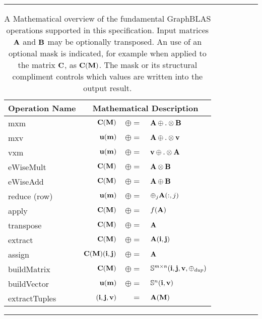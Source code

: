 \begin{table*}[h]
\hrule
\begin{center}
\caption{A Mathematical overview of the fundamental GraphBLAS operations supported
in this specification.  Input matrices ${\bf A}$ and ${\bf B}$ may be optionally
transposed.   An use of an optional mask is indicated, for example when applied to the matrix  ${\bf C}$, 
as ${\bf C}({\bf M})$. The mask or its structural compliment controls 
which values are written into the output result.}
\label{Tab:GraphBLASOps}
\begin{tabular}{l|rrl}
{\sf Operation Name} & \multicolumn{3}{c}{Mathematical Description}  \\
\hline
{\sf mxm}          & ${\bf C}({\bf M})$ & $\oplus=$ & ${\bf A} \oplus.\otimes {\bf B}$  \\
{\sf mxv}          & ${\bf u}({\bf m})$ & $\oplus=$ & ${\bf A} \oplus.\otimes {\bf v}$  \\
{\sf vxm}          & ${\bf u}({\bf m})$ & $\oplus=$ & ${\bf v} \oplus.\otimes {\bf A}$  \\
{\sf eWiseMult}    & ${\bf C}({\bf M})$ & $\oplus=$ & ${\bf A} \otimes {\bf B}$  \\
{\sf eWiseAdd}     & ${\bf C}({\bf M})$ & $\oplus=$ & ${\bf A} \oplus  {\bf B}$  \\
{\sf reduce} (row) & ${\bf u}({\bf m})$ & $\oplus=$ & $\oplus_j{\bf A}(:,j)$  \\
{\sf apply}        & ${\bf C}({\bf M})$ & $\oplus=$ & $f({\bf A})$ \\
{\sf transpose}    & ${\bf C}({\bf M})$ & $\oplus=$ & ${\bf A}$ \\
{\sf extract}      & ${\bf C}({\bf M})$ & $\oplus=$ & ${\bf A}({\bf i},{\bf j})$ \\
{\sf assign}       & ${\bf C}({\bf M})({\bf i},{\bf j})$ & $\oplus=$ & ${\bf A}$ \\
{\sf buildMatrix}  & ${\bf C}({\bf M})$ & $\oplus=$ & $\mathbb{S}^{m\times n}({\bf i},{\bf j},{\bf v},\oplus_{dup})$ \\
{\sf buildVector}  & ${\bf u}({\bf m})$ & $\oplus=$ & $\mathbb{S}^{n}({\bf i},{\bf v})$ \\
{\sf extractTuples}& $({\bf i},{\bf j},{\bf v})$ & $=$ & ${\bf A}({\bf M})$ \\
\end{tabular}
\end{center}
\hrule
\end{table*}




